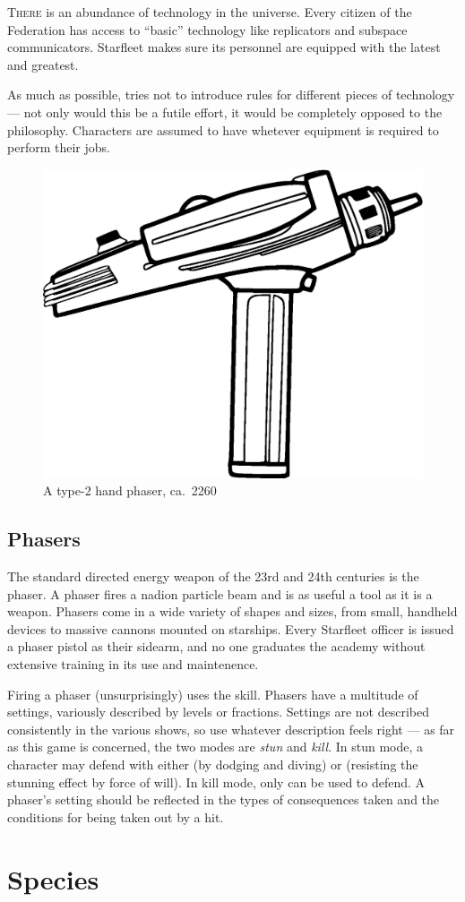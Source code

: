 \documentclass[12pt,titlepage,openany]{book}
\begin{document}
\lettrine[lines=1]{T}{here} is an abundance of technology in the \StarTrek{}
universe. Every citizen of the Federation has access to ``basic'' technology
like replicators and subspace communicators. Starfleet makes sure its personnel
are equipped with the latest and greatest.

As much as possible, \StarTrekFate{} tries not to introduce rules for different
pieces of technology --- not only would this be a futile effort, it would be
completely opposed to the \Fate{} philosophy. Characters are assumed to have
whetever equipment is required to perform their jobs.

\begin{figure}
    \centering
    \includegraphics[width=0.8\linewidth]{img/Phaser.eps}\\
    \vspace{2ex}
    \footnotesize A type-2 hand phaser, ca.\ 2260
\end{figure}

\section{Phasers}\label{sec:phasers}

The standard directed energy weapon of the 23rd and 24th centuries is the
phaser. A phaser fires a nadion particle beam and is as useful a tool as it is
a weapon. Phasers come in a wide variety of shapes and sizes, from small,
handheld devices to massive cannons mounted on starships. Every Starfleet
officer is issued a phaser pistol as their sidearm, and no one graduates the
academy without extensive training in its use and maintenence.

Firing a phaser (unsurprisingly) uses the  skill. Phasers have a
multitude of settings, variously described by levels or fractions. Settings are
not described consistently in the various \StarTrek{} shows, so use whatever
description feels right --- as far as this game is concerned, the two modes are
\emph{stun} and \emph{kill}. In stun mode, a character may defend with either
 (by dodging and diving) or  (resisting the
stunning effect by force of will). In kill mode, only  can be
used to defend. A phaser's setting should be reflected in the types of
consequences taken and the conditions for being taken out by a hit.



\chapter{Species}\label{chap:species}
\end{document}
